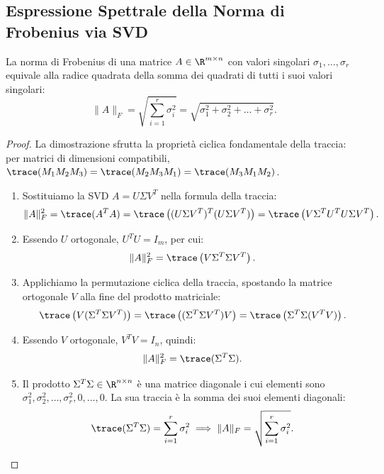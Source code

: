 \subsection{Espressione Spettrale della Norma di Frobenius via SVD}

\begin{theorem}
\label{thm:frobenius-valori-singolari}
La norma di Frobenius di una matrice $A \in \R^{m \times n}$ con valori singolari $\sigma_1, \dots, \sigma_r$ equivale alla radice quadrata della somma dei quadrati di tutti i suoi valori singolari:
\begin{equation}
    \|A\|_F = \sqrt{\sum_{i=1}^r \sigma_i^2} = \sqrt{\sigma_1^2 + \sigma_2^2 + \dots + \sigma_r^2}.
\end{equation}
\end{theorem}

\begin{proof}
La dimostrazione sfrutta la propriet\`a ciclica fondamentale della traccia: per matrici di dimensioni compatibili, $\trace(M_1 M_2 M_3) = \trace(M_2 M_3 M_1) = \trace(M_3 M_1 M_2)$.
\begin{enumerate}
    \item Sostituiamo la SVD $A = U \Sigma V^T$ nella formula della traccia:
    \begin{equation}
        \|A\|_F^2 = \trace(A^T A) = \trace\left( (U \Sigma V^T)^T (U \Sigma V^T) \right) = \trace\left( V \Sigma^T U^T U \Sigma V^T \right).
    \end{equation}
    \item Essendo $U$ ortogonale, $U^T U = I_m$, per cui:
    \begin{equation}
        \|A\|_F^2 = \trace\left( V \Sigma^T \Sigma V^T \right).
    \end{equation}
    \item Applichiamo la permutazione ciclica della traccia, spostando la matrice ortogonale $V$ alla fine del prodotto matriciale:
    \begin{equation}
        \trace\left( V (\Sigma^T \Sigma V^T) \right) = \trace\left( (\Sigma^T \Sigma V^T) V \right) = \trace\left( \Sigma^T \Sigma (V^T V) \right).
    \end{equation}
    \item Essendo $V$ ortogonale, $V^T V = I_n$, quindi:
    \begin{equation}
        \|A\|_F^2 = \trace(\Sigma^T \Sigma).
    \end{equation}
    \item Il prodotto $\Sigma^T \Sigma \in \R^{n \times n}$ \`e una matrice diagonale i cui elementi sono $\sigma_1^2, \sigma_2^2, \dots, \sigma_r^2, 0, \dots, 0$. La sua traccia \`e la somma dei suoi elementi diagonali:
    \begin{equation}
        \trace(\Sigma^T \Sigma) = \sum_{i=1}^r \sigma_i^2 \implies \|A\|_F = \sqrt{\sum_{i=1}^r \sigma_i^2}.
    \end{equation}
\end{enumerate}
\end{proof}

